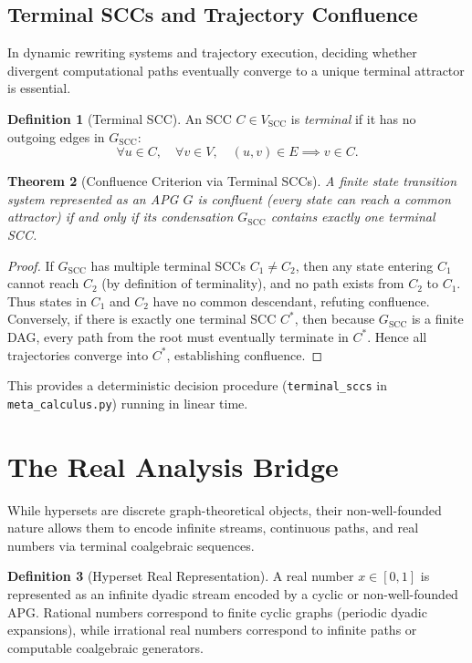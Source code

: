 \documentclass[11pt]{article}
\newtheorem{theorem}{Theorem}[section]
\theoremstyle{definition}
\newtheorem{definition}[theorem]{Definition}
\newcommand{\SCC}{\operatorname{SCC}}
\begin{document}
\subsection{Terminal SCCs and Trajectory Confluence}
In dynamic rewriting systems and trajectory execution, deciding whether divergent computational paths eventually converge to a unique terminal attractor is essential.

\begin{definition}[Terminal SCC]
An SCC $C \in V_{\SCC}$ is \emph{terminal} if it has no outgoing edges in $G_{\SCC}$:
\[
\forall u \in C,\quad \forall v \in V,\quad (u, v) \in E \implies v \in C.
\]
\end{definition}

\begin{theorem}[Confluence Criterion via Terminal SCCs]
A finite state transition system represented as an APG $G$ is confluent (every state can reach a common attractor) if and only if its condensation $G_{\SCC}$ contains exactly one terminal SCC.
\end{theorem}
\begin{proof}
If $G_{\SCC}$ has multiple terminal SCCs $C_1 \ne C_2$, then any state entering $C_1$ cannot reach $C_2$ (by definition of terminality), and no path exists from $C_2$ to $C_1$. Thus states in $C_1$ and $C_2$ have no common descendant, refuting confluence. Conversely, if there is exactly one terminal SCC $C^*$, then because $G_{\SCC}$ is a finite DAG, every path from the root must eventually terminate in $C^*$. Hence all trajectories converge into $C^*$, establishing confluence.
\end{proof}

This provides a deterministic decision procedure (\texttt{terminal\_sccs} in \texttt{meta\_calculus.py}) running in linear time.

\section{The Real Analysis Bridge}
While hypersets are discrete graph-theoretical objects, their non-well-founded nature allows them to encode infinite streams, continuous paths, and real numbers via terminal coalgebraic sequences.

\begin{definition}[Hyperset Real Representation]
A real number $x \in [0, 1]$ is represented as an infinite dyadic stream encoded by a cyclic or non-well-founded APG. Rational numbers correspond to finite cyclic graphs (periodic dyadic expansions), while irrational real numbers correspond to infinite paths or computable coalgebraic generators.
\end{definition}
\end{document}
